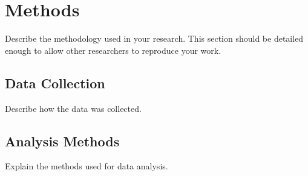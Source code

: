 \section{Methods}
\label{sec:methods}
Describe the methodology used in your research. This section should be detailed enough to allow other researchers to reproduce your work.

\subsection{Data Collection}
Describe how the data was collected.

\subsection{Analysis Methods}
Explain the methods used for data analysis. 